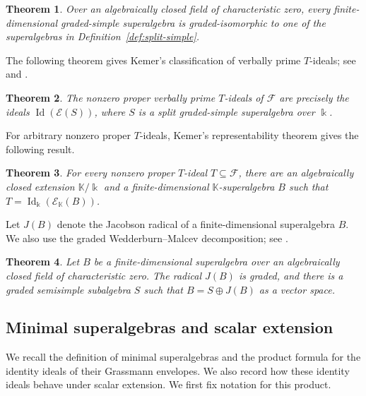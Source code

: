 \documentclass[11pt,reqno]{amsart}
\newcommand{\kk}{\Bbbk}
\newcommand{\KK}{\mathbb{K}}
\newcommand{\F}{\mathcal F}
\newcommand{\E}{\mathcal E}
\newcommand{\Id}{\operatorname{Id}}
\newtheorem{theorem}{Theorem}[section]
\theoremstyle{definition}
\theoremstyle{remark}
\numberwithin{equation}{section}
\begin{document}
\begin{theorem}\label{thm:graded-simple-classification}
Over an algebraically closed field of characteristic zero,
every finite-dimensional graded-simple superalgebra is
graded-isomorphic to one of the superalgebras in
Definition~\ref{def:split-simple}.
\end{theorem}


The following theorem gives Kemer's classification of verbally
prime $T$-ideals; see \cite{GiambrunoZaicev2005} and \cite{Kemer1991}.

\begin{theorem}\label{thm:kemer-classification}
The nonzero proper verbally prime $T$-ideals of $\F$ are
precisely the ideals $\Id(\E(S))$, where $S$ is a split
graded-simple superalgebra over $\kk$.
\end{theorem}



For arbitrary nonzero proper $T$-ideals, Kemer's representability
theorem \cite{AljadeffKanelBelov2010} gives the following result.

\begin{theorem}\label{thm:kemer-representability}
For every nonzero proper $T$-ideal $T\subseteq\F$, there are
an algebraically closed extension $\KK/\kk$ and a finite-dimensional
$\KK$-superalgebra $B$ such that
$
T=\Id_{\kk}(\E_{\KK}(B))$.
\end{theorem}

Let $J(B)$ denote the Jacobson radical of a finite-dimensional
superalgebra $B$. We also use the graded Wedderburn--Malcev
decomposition; see \cite{AljadeffKanelBelov2010}.

\begin{theorem}\label{thm:graded-wedderburn}
Let $B$ be a finite-dimensional superalgebra over an algebraically
closed field of characteristic zero. The radical $J(B)$ is graded,
and there is a graded semisimple subalgebra $S$ such that $
B=S\oplus J(B)$
as a vector space. 
\end{theorem}

\subsection{Minimal superalgebras and scalar extension}\label{subsec:minimal-scalar-extension}

We recall the definition of minimal superalgebras and the product
formula for the identity ideals of their Grassmann envelopes.
We also record how these identity ideals behave under scalar extension.
We first fix notation for this product.
\end{document}
